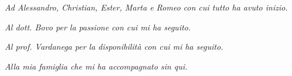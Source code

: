 \thispagestyle{empty}
{}

\vspace*{3cm}

\begin{flushright}
	\emph{Ad Alessandro, Christian, Ester, Marta e Romeo con cui tutto ha avuto inizio.}
	
	\emph{Al dott. Bovo per la passione con cui mi ha seguito.}
	
	\emph{Al prof. Vardanega per la disponibilità con cui mi ha seguito.}
	
	\emph{Alla mia famiglia che mi ha accompagnato sin qui.}
\end{flushright}
